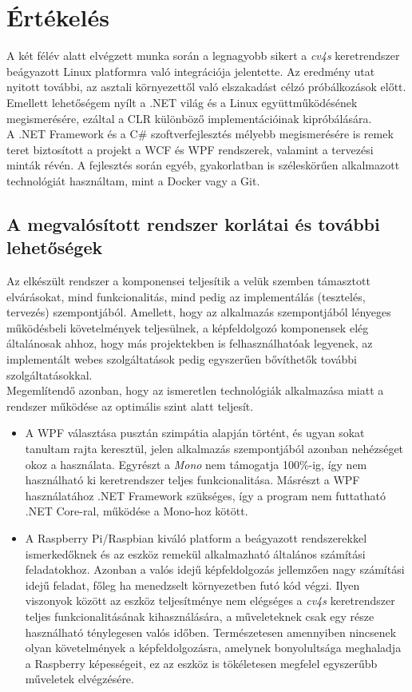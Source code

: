 \chapter{Értékelés}

A két félév alatt elvégzett munka során a legnagyobb sikert a \emph{cv4s} keretrendszer beágyazott Linux platformra való integrációja jelentette. Az eredmény utat nyitott további, az asztali környezettől való elszakadást célzó próbálkozások előtt. Emellett lehetőségem nyílt a .NET világ és a Linux együttműködésének megismerésére, ezáltal a CLR különböző implementációinak kipróbálására.\\
A .NET Framework és a C\# szoftverfejlesztés mélyebb megismerésére is remek teret biztosított a projekt a WCF és WPF rendszerek, valamint a tervezési minták révén. A fejlesztés során egyéb, gyakorlatban is széleskörűen alkalmazott technológiát használtam, mint a Docker vagy a Git.

\section{A megvalósított rendszer korlátai és további lehetőségek}

Az elkészült rendszer a komponensei teljesítik a velük szemben támasztott elvárásokat, mind funkcionalitás, mind pedig az implementálás (tesztelés, tervezés) szempontjából. Amellett, hogy az alkalmazás szempontjából lényeges működésbeli követelmények teljesülnek, a képfeldolgozó komponensek elég általánosak ahhoz, hogy más projektekben is felhasználhatóak legyenek, az implementált webes szolgáltatások pedig egyszerűen bővíthetők további szolgáltatásokkal.\\
Megemlítendő azonban, hogy az ismeretlen technológiák alkalmazása miatt a rendszer működése az optimális szint alatt teljesít.
\begin{itemize}
\item A WPF választása pusztán szimpátia alapján történt, és ugyan sokat tanultam rajta keresztül, jelen alkalmazás szempontjából azonban nehézséget okoz a használata. Egyrészt a \emph{Mono} nem támogatja 100\%-ig, így nem használható ki keretrendszer teljes funkcionalitása. Másrészt a WPF használatához .NET Framework szükséges, így a program nem futtatható .NET Core-ral, működése a Mono-hoz kötött.
\item A Raspberry Pi/Raspbian kiváló platform a beágyazott rendszerekkel ismerkedőknek és az eszköz remekül alkalmazható általános számítási feladatokhoz. Azonban a valós idejű képfeldolgozás jellemzően nagy számítási idejű feladat, főleg ha menedzselt környezetben futó kód végzi. Ilyen viszonyok között az eszköz teljesítménye nem elégséges a \emph{cv4s} keretrendszer teljes funkcionalitásának kihasználására, a műveleteknek csak egy része használható ténylegesen valós időben. Természetesen amennyiben nincsenek olyan követelmények a képfeldolgozásra, amelynek bonyolultsága meghaladja a Raspberry képességeit, ez az eszköz is tökéletesen megfelel egyszerűbb műveletek elvégzésére.
\end{itemize}

